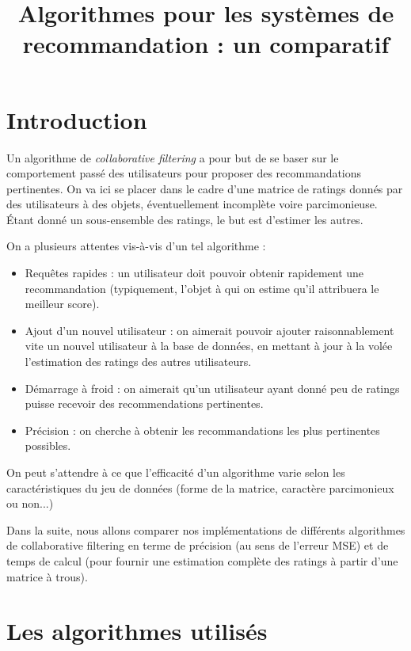 \documentclass[11pt, openany, a4paper]{article}
\begin{document}
\title{Algorithmes pour les systèmes de recommandation : un comparatif}
\date{}
\maketitle
\section*{Introduction}

Un algorithme de \emph{collaborative filtering} a pour but de se baser sur le comportement passé des utilisateurs pour proposer des recommandations pertinentes. On va ici se placer dans le cadre d'une matrice de ratings donnés par des utilisateurs à des objets, éventuellement incomplète voire parcimonieuse. Étant donné un sous-ensemble des ratings, le but est d'estimer les autres.

On a plusieurs attentes vis-à-vis d'un tel algorithme :
\begin{itemize}
	\item{Requêtes rapides : un utilisateur doit pouvoir obtenir rapidement une recommandation (typiquement, l'objet à qui on estime qu'il attribuera le meilleur score).}
	\item{Ajout d'un nouvel utilisateur : on aimerait pouvoir ajouter raisonnablement vite un nouvel utilisateur à la base de données, en mettant à jour à la volée l'estimation des ratings des autres utilisateurs.}
	\item{Démarrage à froid : on aimerait qu'un utilisateur ayant donné peu de ratings puisse recevoir des recommendations pertinentes.}
	\item{Précision : on cherche à obtenir les recommandations les plus pertinentes possibles.}
\end{itemize}

On peut s'attendre à ce que l'efficacité d'un algorithme varie selon les caractéristiques du jeu de données (forme de la matrice, caractère parcimonieux ou non...)

Dans la suite, nous allons comparer nos implémentations de différents algorithmes de collaborative filtering en terme de précision (au sens de l'erreur MSE) et de temps de calcul (pour fournir une estimation complète des ratings à partir d'une matrice à trous).


\tableofcontents

\section{Les algorithmes utilisés}
\end{document}
